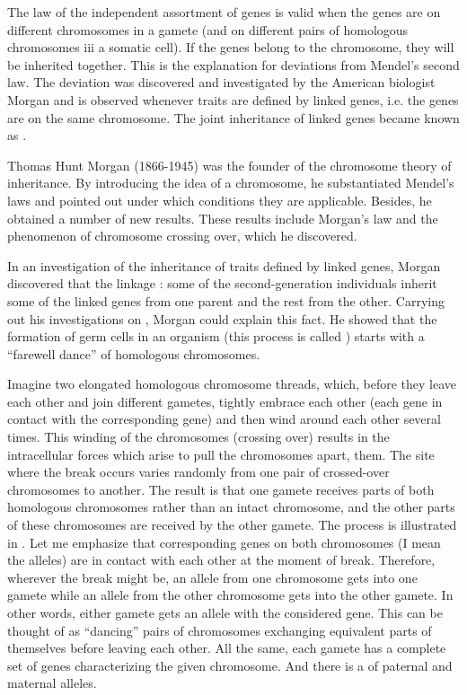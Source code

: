  The law of the independent assortment of genes is valid when the genes are on different chromosomes in a gamete (and on
different pairs of homologous chromosomes iii a somatic cell). If the
genes belong to the  chromosome, they will be inherited together. This is the explanation for deviations from Mendel's second law. The deviation was discovered and investigated by the American biologist
Morgan and is observed whenever traits are defined by linked genes, i.e.
the genes are on the same chromosome. The joint inheritance of linked
genes became known as .

Thomas Hunt Morgan (1866-1945) was the founder of the
chromosome theory of inheritance. By introducing the idea of
a chromosome, he substantiated Mendel's laws and pointed out under
which conditions they are applicable. Besides, he obtained a number of
new results. These results include Morgan's law and the phenomenon of
chromosome crossing over, which he discovered.

 In an investigation of the inheritance of traits defined by linked genes, Morgan discovered that the linkage : some of the second-generation individuals inherit some of the linked genes from one parent and the rest from the other. Carrying out
his investigations on , Morgan could explain this fact. He
showed that the formation of germ cells in an organism (this process is
called ) starts with a ``farewell dance'' of homologous
chromosomes. 

Imagine two elongated homologous chromosome threads, which,
before they leave each other and join different gametes, tightly embrace
each other (each gene in contact with the corresponding gene) and then
wind around each other several times. This winding of the chromosomes
(crossing over) results in the intracellular forces which arise to pull the
chromosomes apart,  them. The site where the break occurs varies randomly from one pair of crossed-over chromosomes to another. The result is that one gamete receives  parts of both homologous chromosomes rather than an intact chromosome, and the other parts of these chromosomes are received by the other gamete. The process is illustrated in . Let me emphasize that corresponding genes on both chromosomes (I mean the alleles) are in contact with each other at the moment of break. Therefore, wherever the break might be, an allele from one chromosome gets into one gamete while an allele from the other chromosome gets into the other gamete. In other words, either gamete gets an allele with the considered gene. This can be thought of as ``dancing'' pairs of chromosomes exchanging equivalent parts of themselves before leaving each other. All the same, each gamete has a complete set of genes characterizing the given chromosome. And there is a  of paternal and maternal alleles.


